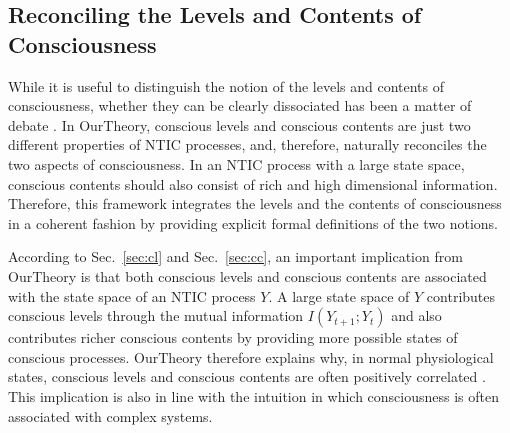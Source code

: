 \documentclass[utf8]{article}
\begin{document}
            
	    \subsection{Reconciling the Levels and Contents of Consciousness}\label{sec:reconcile}
    	    While it is useful to distinguish the notion of the levels and contents of consciousness, whether they can be clearly dissociated has been a matter of debate \citep{bayne2016there, Fazekas2016}. In \ac{OurTheory}, conscious levels and conscious contents are just two different properties of NTIC processes, and, therefore, naturally reconciles the two aspects of consciousness. In an NTIC process with a large state space, conscious contents should also consist of rich and high dimensional information. Therefore, this framework integrates the levels and the contents of consciousness in a coherent fashion by providing explicit formal definitions of the two notions.  
    	    
    	    
    	    According to Sec.~\ref{sec:cl} and Sec.~\ref{sec:cc}, an important implication from \ac{OurTheory} is that both conscious levels and conscious contents are associated with the state space of an NTIC process $Y$. A large state space of $Y$ contributes conscious levels through the mutual information $I(Y_{t+1};Y_{t})$ and also contributes richer conscious contents by providing more possible states of conscious processes. 
    	    \ac{OurTheory} therefore explains why, in normal physiological states, conscious levels and conscious contents are often positively correlated \citep{laureys2005neural}. This implication is also in line with the intuition in which consciousness is often associated with complex systems.
    			
\end{document}
